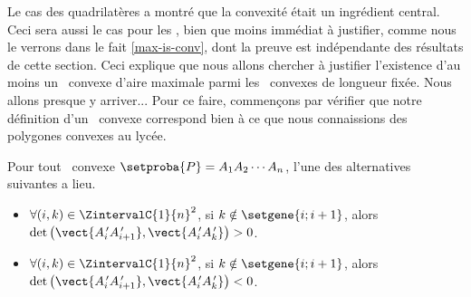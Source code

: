 Le cas des quadrilatères a montré que la convexité était un ingrédient central. Ceci sera aussi le cas pour les \ngones, bien que moins immédiat à justifier, comme nous le verrons dans le fait \ref{max-is-conv}, dont la preuve est indépendante des résultats de cette section.
%
Ceci explique que nous allons chercher à justifier l'existence d'au moins un \ngone\ convexe d'aire maximale parmi les \ngones\ convexes de longueur fixée. Nous allons presque y arriver...
Pour ce faire, commençons par vérifier que notre définition d'un \ngone\ convexe correspond bien à ce que nous connaissions des polygones convexes au lycée.




\begin{fact} \label{conv-pos-det}
    Pour tout \ngone\ convexe $\setproba{P} = A_1 A_2 \cdots A_n$, l'une des alternatives suivantes a lieu.
	\begin{itemize}
		\item $\forall (i, k) \in \ZintervalC{1}{n}^2$,
		si $k \notin \setgene{i ; i+1}$, alors
		$\det \big( \vect{A^{\,\prime}_i A^{\,\prime}_{i+1}}, \vect{A^{\,\prime}_i A^{\,\prime}_k} \big) > 0$.

		\item $\forall (i, k) \in \ZintervalC{1}{n}^2$,
		si $k \notin \setgene{i ; i+1}$, alors
		$\det \big( \vect{A^{\,\prime}_i A^{\,\prime}_{i+1}}, \vect{A^{\,\prime}_i A^{\,\prime}_k} \big) < 0$.
    \end{itemize}
\end{fact}


